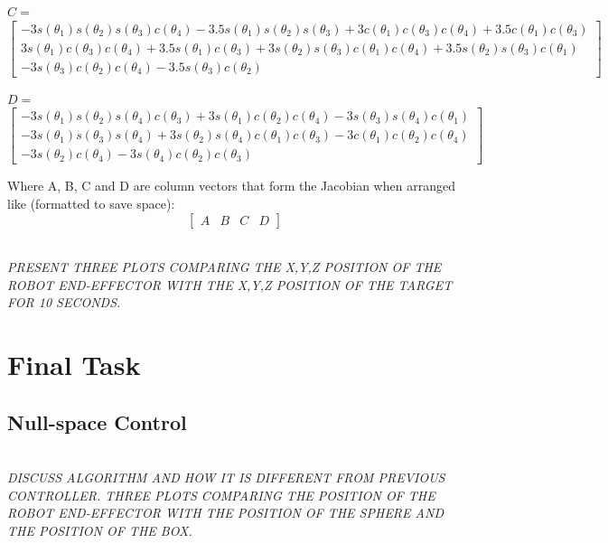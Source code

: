 \documentclass[11pt]{article}
\begin{document}
\begin{center}
    \textbf{$C =$}
    \[\left[\begin{matrix}- 3 s{\left(\theta_{1} \right)} s{\left(\theta_{2} \right)} s{\left(\theta_{3} \right)} c{\left(\theta_{4} \right)} - 3.5 s{\left(\theta_{1} \right)} s{\left(\theta_{2} \right)} s{\left(\theta_{3} \right)} + 3 c{\left(\theta_{1} \right)} c{\left(\theta_{3} \right)} c{\left(\theta_{4} \right)} + 3.5 c{\left(\theta_{1} \right)} c{\left(\theta_{3} \right)}\\3 s{\left(\theta_{1} \right)} c{\left(\theta_{3} \right)} c{\left(\theta_{4} \right)} + 3.5 s{\left(\theta_{1} \right)} c{\left(\theta_{3} \right)} + 3 s{\left(\theta_{2} \right)} s{\left(\theta_{3} \right)} c{\left(\theta_{1} \right)} c{\left(\theta_{4} \right)} + 3.5 s{\left(\theta_{2} \right)} s{\left(\theta_{3} \right)} c{\left(\theta_{1} \right)}\\- 3 s{\left(\theta_{3} \right)} c{\left(\theta_{2} \right)} c{\left(\theta_{4} \right)} - 3.5 s{\left(\theta_{3} \right)} c{\left(\theta_{2} \right)}\end{matrix}\right]\]

    \textbf{$D =$}
    \[\left[\begin{matrix}- 3 s{\left(\theta_{1} \right)} s{\left(\theta_{2} \right)} s{\left(\theta_{4} \right)} c{\left(\theta_{3} \right)} + 3 s{\left(\theta_{1} \right)} c{\left(\theta_{2} \right)} c{\left(\theta_{4} \right)} - 3 s{\left(\theta_{3} \right)} s{\left(\theta_{4} \right)} c{\left(\theta_{1} \right)}\\- 3 s{\left(\theta_{1} \right)} s{\left(\theta_{3} \right)} s{\left(\theta_{4} \right)} + 3 s{\left(\theta_{2} \right)} s{\left(\theta_{4} \right)} c{\left(\theta_{1} \right)} c{\left(\theta_{3} \right)} - 3 c{\left(\theta_{1} \right)} c{\left(\theta_{2} \right)} c{\left(\theta_{4} \right)}\\- 3 s{\left(\theta_{2} \right)} c{\left(\theta_{4} \right)} - 3 s{\left(\theta_{4} \right)} c{\left(\theta_{2} \right)} c{\left(\theta_{3} \right)}\end{matrix}\right]\]
\end{center}
Where A, B, C and D are column vectors that form the Jacobian when arranged like (formatted to save space):
\[\left[\begin{matrix} A & B & C & D \end{matrix}\right]\]

\textit{\\PRESENT THREE PLOTS COMPARING THE X,Y,Z POSITION OF THE ROBOT END-EFFECTOR WITH THE X,Y,Z POSITION OF THE TARGET FOR 10 SECONDS.}

\section{Final Task}
\setcounter{subsection}{1}
\subsection{Null-space Control}

\textit{\\DISCUSS ALGORITHM AND HOW IT IS DIFFERENT FROM PREVIOUS CONTROLLER. THREE PLOTS COMPARING THE POSITION OF THE ROBOT END-EFFECTOR WITH THE POSITION OF THE SPHERE AND THE POSITION OF THE BOX.}
\end{document}
